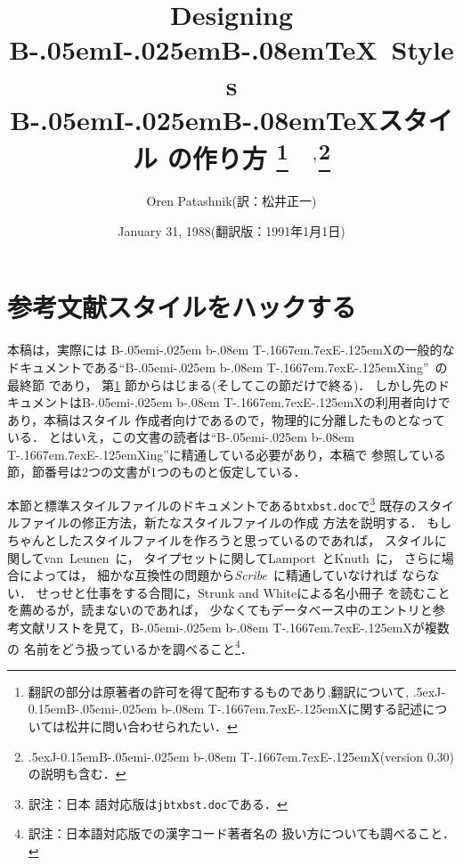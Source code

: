 ﻿ 
\def\dg{\gt}
\def\dm{\mc}
\voffset=-2.3cm
\hoffset=-2.3cm
\textwidth=16.6cm
\textheight=25cm

\def\JTeX{\leavevmode\lower .5ex\hbox{J}\kern-.17em\TeX}
\def\JLaTeX{\leavevmode\lower.5ex\hbox{J}\kern-.17em\LaTeX}
\def\BibTeX{{\rm B\kern-.05em{\sc i\kern-.025em b}\kern-.08em
    T\kern-.1667em\lower.7ex\hbox{E}\kern-.125emX}}

\def\JBibTeX{\leavevmode\lower .5ex\hbox{{\rm J}}\kern-0.15em\BibTeX}
\def\trnote#1{\footnote{\parindent=16pt\hskip-15pt\hang\indent 訳注：#1\parindent=10pt}}


\title{Designing B\kern-.05em{\large I}\kern-.025em{\large B}\kern-.08em\TeX\
 Styles\\
B\kern-.05em{\large I}\kern-.025em{\large B}\kern-.08em\TeX スタイル
の作り方
\footnote{翻訳の部分は原著者の許可を得て配布するものであり,翻訳について,
\JBibTeX に関する記述については松井に問い合わせられたい．}
\ $^,$\footnote{\JBibTeX (version 0.30)\cite{jbibtex}の説明も含む．}
}

\author{Oren Patashnik(訳：松井正一)}
\date{January 31, 1988(翻訳版：1991年1月1日)}
\def\orig#1{}

\baselineskip=17pt

\maketitle

\setcounter{section}{4}
\section{参考文献スタイルをハックする}
\label{style}
本稿は，実際には
\BibTeX の一般的なドキュメントである``\BibTeX ing''~\cite{btxdoc}の最終節
であり，
第\ref{style} 節からはじまる(そしてこの節だけで終る)．
しかし先のドキュメントは\BibTeX の利用者向けであり，本稿はスタイル
作成者向けであるので，物理的に分離したものとなっている．
とはいえ，この文書の読者は``\BibTeX ing''に精通している必要があり，本稿で
参照している節，節番号は2つの文書が1つのものと仮定している．

本節と標準スタイルファイルのドキュメントである{\tt btxbst.doc}で\trnote{日本
語対応版は{\tt jbtxbst.doc}である．}
既存のスタイルファイルの修正方法，新たなスタイルファイルの作成
方法を説明する．
もしちゃんとしたスタイルファイルを作ろうと思っているのであれば，
スタイルに関してvan~Leunen~\cite{van-leunen}に，
タイプセットに関してLamport~\cite{latex}とKnuth~\cite{texbook}に，
さらに場合によっては，
細かな互換性の問題から{\em Scribe\/}~\cite{scribe}に精通していなければ
ならない．
せっせと仕事をする合間に，Strunk and Whiteによる名小冊子
\cite{strunk-and-white}を読むことを薦めるが，読まないのであれば，
少なくてもデータベース中のエントリと参考文献リストを見て，\BibTeX が複数の
名前をどう扱っているかを調べること\trnote{日本語対応版での漢字コード著者名の
扱い方についても調べること．}．

